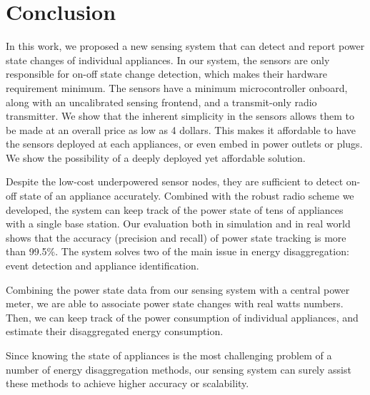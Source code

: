 \chapter{Conclusion}\label{chap6}

In this work, we proposed a new sensing system that can detect and report power state changes of individual appliances. In our system, the sensors are only responsible for on-off state change detection, which makes their hardware requirement minimum. The sensors have a minimum microcontroller onboard, along with an uncalibrated sensing frontend, and a transmit-only radio transmitter. We show that the inherent simplicity in the sensors allows them to be made at an overall price as low as 4 dollars. This makes it affordable to have the sensors deployed at each appliances, or even embed in power outlets or plugs. We show the possibility of a deeply deployed yet affordable solution. 

Despite the low-cost underpowered sensor nodes, they are sufficient to detect on-off state of an appliance accurately. Combined with the robust radio scheme we developed, the system can keep track of the power state of tens of appliances with a single base station. Our evaluation both in simulation and in real world shows that the accuracy (precision and recall) of power state tracking is more than 99.5\%. The system solves two of the main issue in energy disaggregation: event detection and appliance identification. 

Combining the power state data from our sensing system with a central power meter, we are able to associate power state changes with real watts numbers. Then, we can keep track of the power consumption of individual appliances, and estimate their disaggregated energy consumption. 

Since knowing the state of appliances is the most challenging problem of a number of energy disaggregation methods, our sensing system can surely assist these methods to achieve higher accuracy or scalability. 

